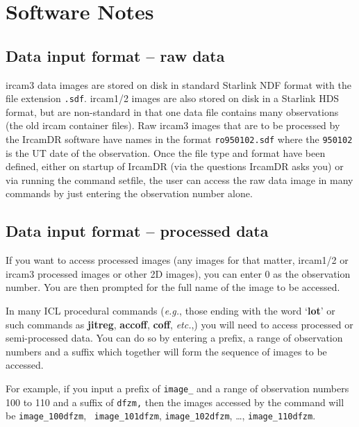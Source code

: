 \section{\label{se:soft_notes}Software Notes}

\subsection{\label{ss:data_input_format_raw}Data input format -- raw data}

{\sc ircam3} data images are stored on disk in standard Starlink NDF
format with the file extension {\tt .sdf}.  {\sc ircam1/2} images are
also stored on disk in a Starlink HDS format, but are non-standard in
that one data file contains many observations (the old {\sc ircam}
container files). Raw {\sc ircam3} images that are to be processed by
the {\sc IrcamDR} software have names in the format {\tt ro950102.sdf}
where the {\tt 950102} is the UT date of the observation.  Once the
file type and format have been defined, either on startup of {\sc
IrcamDR} (via the questions {\sc IrcamDR} asks you) or via running the
command setfile, the user can access the raw data image in many
commands by just entering the observation number alone.

\subsection{\label{ss:data_input_format_processed}Data input format -- processed data}

If you want to access processed images (any images for that
matter, {\sc ircam1/2} or {\sc ircam3} processed images or other 2D
images), you can enter 0 as the observation number.  You are then
prompted for the full name of the image to be accessed.  

In many ICL procedural commands (\emph{e.g.}, those ending with the word
`{\bf lot}' or such commands as {\bf jitreg}, {\bf accoff}, {\bf coff}, 
\emph{etc.},) you will need to access processed or semi-processed data.
You can do so by entering a prefix, a range of observation numbers
and a suffix which together will form the sequence of images to be
accessed.

For example, if you input a prefix of {\tt image\_} and a range of
observation numbers 100 to 110 and a suffix of {\tt dfzm,} then the
images accessed by the command will be {\tt image\_100dfzm}, {\tt
image\_101dfzm}, {\tt image\_102dfzm}, \ldots, {\tt image\_110dfzm}.

